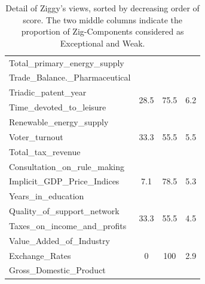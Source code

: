\begin{table}[!ht]
\begin{tabular}{p{4cm} c c c}
        Total\_primary\_energy\_supply&&&\\ 
        Trade\_Balance.\_Pharmaceutical&&&\\ 
        \hline
        Triadic\_patent\_year&
        \multirow{2}{*}{28.5} &\multirow{2}{*}{75.5} & \multirow{2}{*}{6.2} \\
        Time\_devoted\_to\_leisure&&&\\ 
        \hline
        Renewable\_energy\_supply&
        \multirow{3}{*}{33.3} &\multirow{3}{*}{55.5} & \multirow{3}{*}{5.5} \\
        Voter\_turnout&&&\\ 
        Total\_tax\_revenue&&&\\ 
        \hline
        Consultation\_on\_rule\_making&
        \multirow{3}{*}{7.1} &\multirow{3}{*}{78.5} & \multirow{3}{*}{5.3} \\
        Implicit\_GDP\_Price\_Indices&&&\\
        Years\_in\_education&&&\\
        \hline
        Quality\_of\_support\_network&
        \multirow{2}{*}{33.3} &\multirow{2}{*}{55.5} & \multirow{2}{*}{4.5} \\
        Taxes\_on\_income\_and\_profits&&&\\
        \hline
        Value\_Added\_of\_Industry&
        \multirow{3}{*}{0} &\multirow{3}{*}{100} & \multirow{3}{*}{2.9} \\
        Exchange\_Rates&&&\\
        Gross\_Domestic\_Product&&&\\
        \hline
    \end{tabular}
    \caption{Detail of Ziggy's views, sorted by decreasing order of score. The
    two middle columns indicate the proportion of Zig-Components considered as
Exceptional and Weak.}
    \label{tab:ziggysviews}
\end{table}
